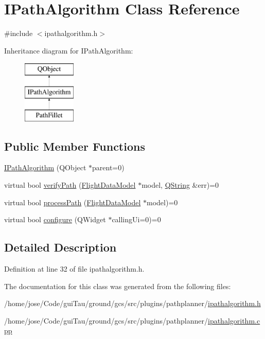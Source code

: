\hypertarget{class_i_path_algorithm}{\section{I\-Path\-Algorithm Class Reference}
\label{class_i_path_algorithm}
}


{\ttfamily \#include $<$ipathalgorithm.\-h$>$}

Inheritance diagram for I\-Path\-Algorithm\-:\begin{figure}[H]
\begin{center}
\leavevmode
\includegraphics[height=3.000000cm]{class_i_path_algorithm}
\end{center}
\end{figure}
\subsection*{Public Member Functions}
\begin{DoxyCompactItemize}
\item 
\hyperlink{group___path_gafe016f55fde1369cf1d9301f86b37c2a}{I\-Path\-Algorithm} (Q\-Object $\ast$parent=0)
\item 
virtual bool \hyperlink{group___path_ga115e5e8fbbb0f1e2a1208be63bafdb5e}{verify\-Path} (\hyperlink{class_flight_data_model}{Flight\-Data\-Model} $\ast$model, \hyperlink{group___u_a_v_objects_plugin_gab9d252f49c333c94a72f97ce3105a32d}{Q\-String} \&err)=0
\item 
virtual bool \hyperlink{group___path_ga7c93a036e8d5904a4c76444e38ec96b9}{process\-Path} (\hyperlink{class_flight_data_model}{Flight\-Data\-Model} $\ast$model)=0
\item 
virtual bool \hyperlink{group___path_ga4157a802d06807c33e402f6a51f9f366}{configure} (Q\-Widget $\ast$calling\-Ui=0)=0
\end{DoxyCompactItemize}


\subsection{Detailed Description}


Definition at line 32 of file ipathalgorithm.\-h.



The documentation for this class was generated from the following files\-:\begin{DoxyCompactItemize}
\item 
/home/jose/\-Code/gui\-Tau/ground/gcs/src/plugins/pathplanner/\hyperlink{ipathalgorithm_8h}{ipathalgorithm.\-h}\item 
/home/jose/\-Code/gui\-Tau/ground/gcs/src/plugins/pathplanner/\hyperlink{ipathalgorithm_8cpp}{ipathalgorithm.\-cpp}\end{DoxyCompactItemize}
